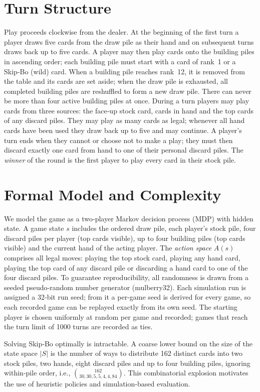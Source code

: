 \documentclass[twoside]{mitthesis}
\begin{document}
\section{Turn Structure}
Play proceeds clockwise from the dealer.  At the beginning of the first turn a player draws five cards from the draw pile as their hand and on subsequent turns draws back up to five cards.  A player may then play cards onto the building piles in ascending order; each building pile must start with a card of rank 1 or a Skip‑Bo (wild) card.  When a building pile reaches rank 12, it is removed from the table and its cards are set aside; when the draw pile is exhausted, all completed building piles are reshuffled to form a new draw pile.  There can never be more than four active building piles at once.  During a turn players may play cards from three sources: the face‑up stock card, cards in hand and the top cards of any discard piles.  They may play as many cards as legal; whenever all hand cards have been used they draw back up to five and may continue.  A player's turn ends when they cannot or choose not to make a play; they must then discard exactly one card from hand to one of their personal discard piles.  The \emph{winner} of the round is the first player to play every card in their stock pile.

\section{Formal Model and Complexity}
We model the game as a two‑player Markov decision process (MDP) with hidden state.  A game state $s$ includes the ordered draw pile, each player's stock pile, four discard piles per player (top cards visible), up to four building piles (top cards visible) and the current hand of the acting player.  The \emph{action space} $A(s)$ comprises all legal moves: playing the top stock card, playing any hand card, playing the top card of any discard pile or discarding a hand card to one of the four discard piles.  To guarantee reproducibility, all randomness is drawn from a seeded pseudo‑random number generator (mulberry32). Each simulation run is assigned a 32‑bit run seed; from it a per‑game seed is derived for every game, so each recorded game can be replayed exactly from its own seed. The starting player is chosen uniformly at random per game and recorded; games that reach the turn limit of 1000 turns are recorded as ties.

Solving Skip‑Bo optimally is intractable.  A coarse lower bound on the size of the state space $|S|$ is the number of ways to distribute 162 distinct cards into two stock piles, two hands, eight discard piles and up to four building piles, ignoring within‑pile order, i.e., \(\binom{162}{30,30,5,5,4,4,84}\).  This combinatorial explosion motivates the use of heuristic policies and simulation‑based evaluation.
\end{document}
